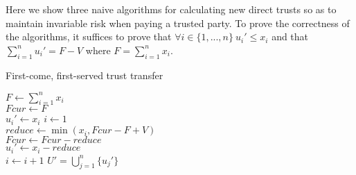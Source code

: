 \documentclass[11pt]{article}
\theoremstyle{definition}
\theoremstyle{corollary}
\begin{document}
    Here we show three naive algorithms for calculating new direct trusts so as to maintain invariable risk when paying
    a trusted party. To prove the correctness of the algorithms, it suffices to prove that $\forall i \in \{1,...,n\} \:
    u_i' \leq x_i$ and that $\sum\limits_{i=1}^{n}u_i' = F - V$ where $F = \sum\limits_{i=1}^{n}x_i$. \\
    \begin{algorithm}[H]
       \label{fcfs}
       \caption{First-come, first-served trust transfer}
       $F \gets \sum\limits_{i=1}^{n}x_i$ \\
       $Fcur \gets F$ \\
          {$u_i' \gets x_i$} 
       $i \gets 1$ \\
          {$reduce \gets \min{(x_i, Fcur - F + V)}$ \\
           $Fcur \gets Fcur - reduce$ \\
           $u_i' \gets x_i - reduce$ \\
           $i \gets i + 1$}
       \Return $U' = \bigcup\limits_{j=1}^{n}\{u_j'\}$
    \end{algorithm}
\end{document}
